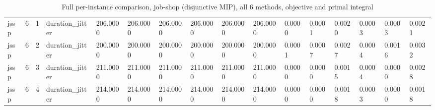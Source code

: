 \begin{table}[t]
\begin{tabular}{llllllllllllllll}
jssp & 6 & 1 & duration\_jitter & 206.0000 & 206.0000 & 206.0000 & 206.0000 & 206.0000 & 206.0000 & 0.0000 & 0.0001 & 0.0020 & 0.0003 & 0.0003 & 0.0021 \\
jssp & 6 & 2 & duration\_jitter & 200.0000 & 200.0000 & 200.0000 & 200.0000 & 200.0000 & 200.0000 & 0.0001 & 0.0007 & 0.0027 & 0.0004 & 0.0016 & 0.0032 \\
jssp & 6 & 3 & duration\_jitter & 211.0000 & 211.0000 & 211.0000 & 211.0000 & 211.0000 & 211.0000 & 0.0000 & 0.0000 & 0.0015 & 0.0004 & 0.0000 & 0.0028 \\
jssp & 6 & 4 & duration\_jitter & 214.0000 & 214.0000 & 214.0000 & 214.0000 & 214.0000 & 214.0000 & 0.0000 & 0.0000 & 0.0018 & 0.0003 & 0.0000 & 0.0018 \\
\bottomrule
\end{tabular}
\caption{Full per-instance comparison, job-shop (disjunctive MIP), all 6 methods, objective and primal integral}
\label{tab:multisolver-full-jssp}
\end{table}
